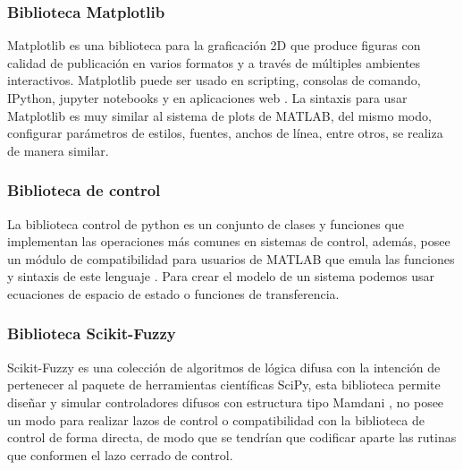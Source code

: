 		\subsubsection{Biblioteca Matplotlib}

			Matplotlib es una biblioteca para la graficación 2D que produce figuras con calidad de publicación en varios formatos y a través de múltiples ambientes interactivos. Matplotlib puede ser usado en scripting, consolas de comando, IPython, jupyter notebooks y en aplicaciones web \Parencite{Hunter:2007}. La sintaxis para usar Matplotlib es muy similar al sistema de plots de MATLAB, del mismo modo, configurar parámetros de estilos, fuentes, anchos de línea, entre otros, se realiza de manera similar.

		\subsubsection{Biblioteca de control}

			La biblioteca control de python es un conjunto de clases y funciones que implementan las operaciones más comunes en sistemas de control, además, posee un módulo de compatibilidad para usuarios de MATLAB que emula las funciones y sintaxis de este lenguaje \Parencite{pythoncontrol}. Para crear el modelo de un sistema podemos usar ecuaciones de espacio de estado o funciones de transferencia.

		\subsubsection{Biblioteca Scikit-Fuzzy}
			
			Scikit-Fuzzy es una colección de algoritmos de lógica difusa con la intención de pertenecer al paquete de herramientas científicas SciPy, esta biblioteca permite diseñar y simular controladores difusos con estructura tipo Mamdani \Parencite{warner2016fuzzy}, no posee un modo para realizar lazos de control o compatibilidad con la biblioteca de control de forma directa, de modo que se tendrían que codificar aparte las rutinas que conformen el lazo cerrado de control.
			